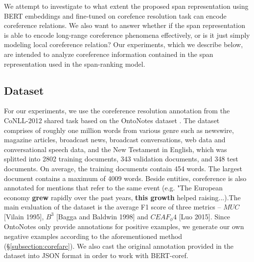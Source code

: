 \documentclass[11pt]{article}
\begin{document}


We attempt to investigate to what extent the proposed span representation using BERT embeddings and fine-tuned on corefence resolution task can encode coreference relations. We also want to answer whether if the span representation is able to encode long-range coreference phenomena effectively, or is it just simply modeling local coreference relation? Our experiments, which we describe below, are intended to analyze coreference information contained in the span representation used in the span-ranking model. 

\subsection{Dataset}
For our experiments, we use the coreference resolution annotation
from the CoNLL-2012 shared task based on the OntoNotes dataset \parencite{conll}. The dataset comprises of roughly one million words from various genre such as newswire, magazine articles, broadcast news, broadcast conversations, web data and conversational speech data, and the New Testament in English, which was splitted into 2802 training documents, 343 validation documents, and 348 test documents. On average, the training documents contain 454 words. The largest document contains a maximum of 4009 words. Beside entities, coreference is also annotated for mentions that refer to the same event (e.g. "The European economy \textbf{grew} rapidly over the past years, \textbf{this growth} helped raising...).The main evaluation of the dataset is the average F1 score of three metrics – $MUC$ [Vilain 1995], $B^3$ [Bagga and Baldwin 1998] and $CEAF_ \phi4$ [Luo 2015]. Since OntoNotes only provide annotations for positive examples, we generate our own negative examples according to the aforementioned method (\S \ref{subsection:corefarc}). We also cast the original annotation provided in the dataset into JSON format in order to work with BERT-coref. 
\end{document}
